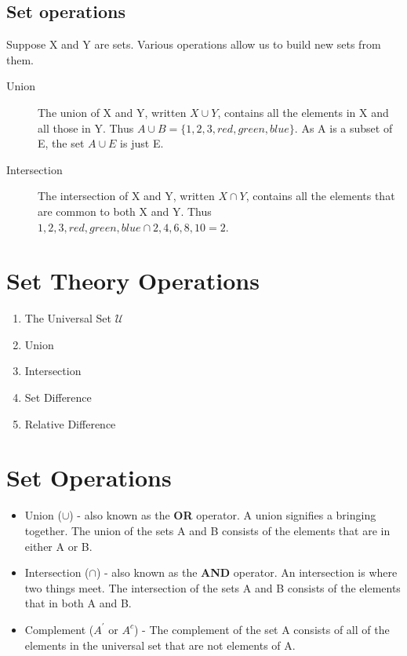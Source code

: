 \documentclass[12pt]{article}
\begin{document}
\subsection{Set operations}

Suppose X and Y are sets. Various operations allow us to build new sets from them.

\begin{description}
\item[Union]
The union of X and Y, written $X\cup Y$, contains all the elements in X and all those in Y. Thus $A \cup B = \{1, 2, 3, red, green, blue\}$. 
As A is a subset of E, the set $A \cup E$ is just E.

\item[Intersection]

The intersection of X and Y, written $X \cap Y$, contains all the elements that are common to both X and Y. Thus ${1,2,3,red,green,blue} \cap {2,4,6,8,10} = {2}$.


\end{description}




\section{Set Theory Operations}
\begin{enumerate}
\item The Universal Set $\mathcal{U}$
\item Union
\item Intersection
\item Set Difference
\item Relative Difference
\end{enumerate}

\section*{Set Operations}
\begin{itemize}
\item Union ($\cup$) - also known as the \textbf{OR} operator. A union signifies a bringing together. The union of the sets A and B consists of the elements that are in either A or B.
\item Intersection ($\cap$) - also known as the \textbf{AND} operator. An intersection is where two things meet. The intersection of the sets A and B consists of the elements that in both A and B.
\item Complement ($A^{\prime}$ or $A^{c}$) - The complement of the set A consists of all of the elements in the universal set that are not elements of A.
\end{itemize}
\end{document}
